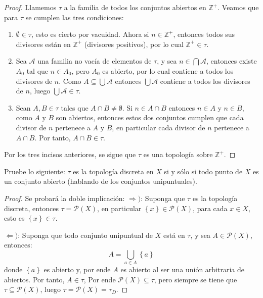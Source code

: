 \documentclass[12pt]{report}
\theoremstyle{largebreak}
\begin{document}
    \begin{proof}
        Llamemos $\tau$ a la familia de todos los conjuntos abiertos en $\mathbb{Z}^+$. Veamos que para $\tau$ se cumplen las tres condiciones:
        \begin{enumerate}
            \item $\emptyset\in\tau$, esto es cierto por vacuidad. Ahora si $n\in\mathbb{Z}^+$, entonces todos sus divisores están en $\mathbb{Z}^+$ (divisores positivos), por lo cual $\mathbb{Z}^+\in\tau$.
            \item Sea $\mathcal{A}$ una familia no vacía de elementos de $\tau$, y sea $n\in\bigcap\mathcal{A}$, entonces existe $A_0$ tal que $n\in A_0$, pero $A_0$ es abierto, por lo cual contiene a todos los divisores de $n$. Como $A\subseteq\bigcup\mathcal{A}$ entonces $\bigcup\mathcal{A}$ contiene a todos los divisores de $n$, luego $\bigcup\mathcal{A}\in\tau$.
            \item Sean $A,B\in\tau$ tales que $A\cap B\neq\emptyset$. Si $n\in A\cap B$ entonces $n\in A$ y $n\in B$, como $A$ y $B$ son abiertos, entonces estos dos conjuntos cumplen que cada divisor de $n$ pertenece a $A$ y $B$, en particular cada divisor de $n$ pertenece a $A\cap B$. Por tanto, $A\cap B\in\tau$. 
        \end{enumerate}
        Por los tres incisos anteriores, se sigue que $\tau$ es una topología sobre $\mathbb{Z}^+$.
    \end{proof}

    \begin{excer}
        Pruebe lo siguiente: $\tau$ es la topología discreta en $X$ si y sólo si todo punto de $X$ es un conjunto abierto (hablando de los conjuntos unipuntuales). 
    \end{excer}

    \begin{proof}
        Se probará la doble implicación:
        $\Rightarrow)$: Suponga que $\tau$ es la topología discreta, entonces $\tau=\mathcal{P}(X)$, en particular $\left\{x\right\}\in \mathcal{P}(X)$, para cada $x\in X$, esto es $\left\{x\right\}\in\tau$.

        $\Leftarrow)$: Suponga que todo conjunto unipuntual de $X$ está en $\tau$, y sea $A\in\mathcal{P}(X)$, entonces:
        \begin{equation*}
            A=\bigcup_{a\in A}\left\{a\right\}
        \end{equation*}
        donde $\left\{a\right\}$ es abierto y, por ende $A$ es abierto al ser una unión arbitraria de abiertos. Por tanto, $A\in\tau$, Por ende $\mathcal{P}(X)\subseteq\tau$, pero siempre se tiene que $\tau\subseteq\mathcal{P}(X)$, luego $\tau=\mathcal{P}(X)=\tau_D$.
    \end{proof}
\end{document}
